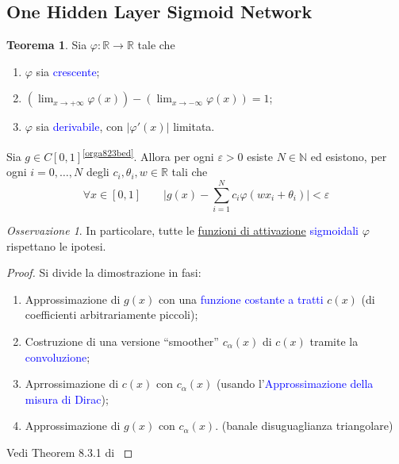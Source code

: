\documentclass[10pt]{book}
\newcommand{\1}{\mathds{1}}
\newcommand{\R}{\mathds{R}}
\newcommand{\N}{\mathds{N}}
\theoremstyle{definition}%
\newtheorem{thm}{Teorema}[section]
\theoremstyle{plain}
\theoremstyle{remark}
\newtheorem*{oss}{Osservazione}
\renewcommand{\href}[2]{\textcolor{blue}{#2}}
\begin{document}
\subsection{One Hidden Layer Sigmoid Network}
\label{sec:org2dd54fe}

\begin{thm}
Sia \(\varphi:\R\to \R\) tale che
\begin{enumerate}
\item \(\varphi\) sia \href{../../../../../org/roam/20250203132953-funzione_monotona.org}{crescente};
\item \((\lim_{x\to+\infty}\varphi(x))-(\lim_{x\to-\infty}\varphi(x)) = 1\);
\item \(\varphi\) sia \href{../../../../../org/roam/20250627155431-funzione_derivabile.org}{derivabile}, con \(|\varphi'(x)|\) limitata.
\end{enumerate}

Sia \(g \in C[0,1]\)\textsuperscript{\ref{orga823bed}}. Allora per ogni \(\varepsilon>0\) esiste \(N \in \N\) ed esistono, per ogni \(i=0,\dots,N\) degli \(c_{i}, \theta_{i}, w \in \R\) tali che
\begin{equation*}
\forall  x \in [0,1]\qquad \bigg\lvert g(x) - \sum_{i=1}^{N} c_{i}\varphi(wx_{i} + \theta_{i})\bigg\rvert <\varepsilon
\end{equation*}
\end{thm}

\begin{oss}
In particolare, tutte le \hyperref[sec:org08fce50]{funzioni di attivazione} \href{../../../../../org/roam/20250625110110-funzione_sigmoidale.org}{sigmoidali} \(\varphi\) rispettano le ipotesi.
\end{oss}

\begin{proof}
Si divide la dimostrazione in fasi:
\begin{enumerate}
\item Approssimazione di \(g(x)\) con una \href{../../../../../org/roam/20250701140621-funzione_costante_a_tratti.org}{funzione costante a tratti} \(c(x)\) (di coefficienti arbitrariamente piccoli);
\item Costruzione di una versione ``smoother'' \(c_{\alpha}(x)\) di \(c(x)\) tramite la \href{../../../../../org/roam/20250703105424-prodotto_di_convoluzione.org}{convoluzione};
\item Aprrossimazione di \(c(x)\) con \(c_{\alpha}(x)\) (usando l'\href{../../../../../org/roam/20250630155139-misura_di_dirac_approssimata_da_misure_a_campana.org}{Approssimazione della misura di Dirac});
\item Approssimazione di \(g(x)\) con \(c_{\alpha}(x)\). (banale disuguaglianza triangolare)
\end{enumerate}

Vedi Theorem 8.3.1 di \cite{calinDeepLearningArchitectures2020}
\end{proof}
\end{document}
